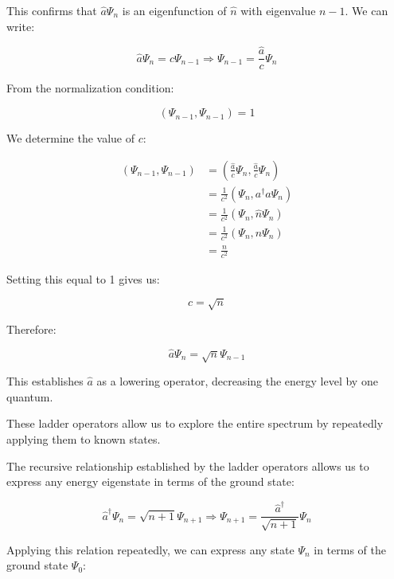 \documentclass[italian]{HKNdocument}
\begin{document}
This confirms that $\hat{a}\Psi_n$ is an eigenfunction of $\hat{n}$ with eigenvalue $n-1$. We can write:

\begin{equation}
\hat{a}\Psi_n = c\Psi_{n-1} \Longrightarrow \Psi_{n-1} = \frac{\hat{a}}{c}\Psi_n \label{eq:5.31}
\end{equation}

From the normalization condition:

\begin{equation}
(\Psi_{n-1}, \Psi_{n-1}) = 1 \label{eq:5.32}
\end{equation}

We determine the value of $c$:

\begin{align}
(\Psi_{n-1}, \Psi_{n-1}) &= \left(\frac{\hat{a}}{c}\Psi_n, \frac{\hat{a}}{c}\Psi_n\right) \\
&= \frac{1}{c^2}(\Psi_n, a^\dagger a\Psi_n) \\
&= \frac{1}{c^2}(\Psi_n, \hat{n}\Psi_n) \label{eq:5.33} \\
&= \frac{1}{c^2}(\Psi_n, n\Psi_n) \\
&= \frac{n}{c^2}
\end{align}

Setting this equal to 1 gives us:

\begin{equation}
c = \sqrt{n} \label{eq:5.34}
\end{equation}

Therefore:

\begin{equation}
\hat{a}\Psi_n = \sqrt{n}\Psi_{n-1} \label{eq:5.35}
\end{equation}

This establishes $\hat{a}$ as a lowering operator, decreasing the energy level by one quantum.

These ladder operators allow us to explore the entire spectrum by repeatedly applying them to known states.


The recursive relationship established by the ladder operators allows us to express any energy eigenstate in terms of the ground state:

\begin{equation}
\hat{a}^\dagger\Psi_n = \sqrt{n+1}\Psi_{n+1} \Longrightarrow \Psi_{n+1} = \frac{\hat{a}^\dagger}{\sqrt{n+1}}\Psi_n \label{eq:5.36}
\end{equation}

Applying this relation repeatedly, we can express any state $\Psi_n$ in terms of the ground state $\Psi_0$:
\end{document}
